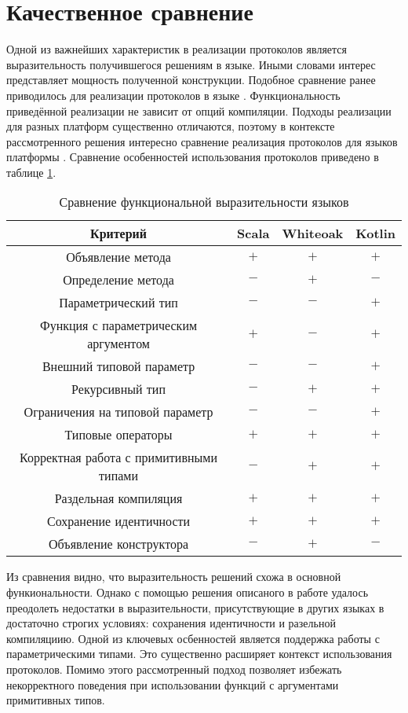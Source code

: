 \section{Качественное сравнение}
Одной из важнейших характеристик в реализации протоколов является выразительность получившегося решениям в языке. Иными словами интерес представляет мощность полученной конструкции. Подобное сравнение ранее приводилось для реализации протоколов в языке \cite{whiteoak}. Функциональность приведённой реализации не зависит от опций компиляции. Подходы реализации для разных платформ существенно отличаются, поэтому в контексте рассмотренного решения интересно сравнение реализация протоколов для языков платформы . Сравнение особенностей использования протоколов приведено в таблице \ref{features_comparison}.

\begin{table}[htb]
  \begin{center}
    \begin{tabular}{|c|c|c|c|} \hline
      Критерий & Scala & Whiteoak & Kotlin \\ \hline
      Объявление метода & $+$ & $+$ & $+$ \\ \hline
      Определение метода & $-$ & $+$ & $-$ \\ \hline
      Параметрический тип & $-$ & $-$ & $+$ \\ \hline
      Функция с параметрическим аргументом & $+$ & $-$ & $+$ \\ \hline
      Внешний типовой параметр & $-$ & $-$ & $+$ \\ \hline
      Рекурсивный тип & $-$ & $+$ & $+$ \\ \hline
      Ограничения на типовой параметр & $-$ & $-$ & $+$ \\ \hline
      Типовые операторы & $+$ & $+$ & $+$ \\ \hline
      Корректная работа с примитивными типами & $-$ & $+$ & $+$ \\ \hline
      Раздельная компиляция & $+$ & $+$ & $+$ \\ \hline
      Сохранение идентичности & $+$ & $+$ & $+$ \\ \hline
      Объявление конструктора & $-$ & $+$ & $-$ \\ \hline
    \end{tabular}
    \caption{Сравнение функциональной выразительности языков}
    \label{features_comparison}
  \end{center}
\end{table}

Из сравнения видно, что выразительность решений схожа в основной функиональности. Однако с помощью решения описаного в работе удалось преодолеть недостатки в выразительности, присутствующие в других языках в достаточно строгих условиях: сохранения идентичности и разельной компиляциию. Одной из ключевых осбенностей является поддержка работы с параметрическими типами. Это существенно расширяет контекст использования протоколов. Помимо этого рассмотренный подход позволяет избежать некорректного поведения при использовании функций с аргументами примитивных типов.
